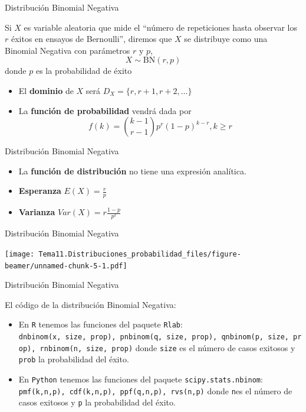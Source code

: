 \documentclass[
  ignorenonframetext,
]{beamer}
\providecommand{\tightlist}{%
  \setlength{\itemsep}{0pt}\setlength{\parskip}{0pt}}
\begin{document}
\begin{frame}{Distribución Binomial Negativa}
\protect\hypertarget{distribuciuxf3n-binomial-negativa}{}

Si \(X\) es variable aleatoria que mide el ``número de repeticiones
hasta observar los \(r\) éxitos en ensayos de Bernoulli'', diremos que
\(X\) se distribuye como una Binomial Negativa con parámetros \(r\) y
\(p\), \[X\sim\text{BN}(r,p)\] donde \(p\) es la probabilidad de éxito

\begin{itemize}
\tightlist
\item
  El \textbf{dominio} de \(X\) será \(D_X = \{r, r+1, r+2,\dots\}\)
\item
  La \textbf{función de probabilidad} vendrá dada por
  \[f(k) = {k-1\choose r-1}p^r(1-p)^{k-r}, k\geq r\]
\end{itemize}

\end{frame}

\begin{frame}{Distribución Binomial Negativa}
\protect\hypertarget{distribuciuxf3n-binomial-negativa-1}{}

\begin{itemize}
\tightlist
\item
  La \textbf{función de distribución} no tiene una expresión analítica.
\item
  \textbf{Esperanza} \(E(X) = \frac{r}{p}\)
\item
  \textbf{Varianza} \(Var(X) = r\frac{1-p}{p^2}\)
\end{itemize}

\end{frame}

\begin{frame}{Distribución Binomial Negativa}
\protect\hypertarget{distribuciuxf3n-binomial-negativa-2}{}

\texttt{[image: Tema11.Distribuciones\_probabilidad\_files/figure-beamer/unnamed-chunk-5-1.pdf]}

\end{frame}

\begin{frame}[fragile]{Distribución Binomial Negativa}
\protect\hypertarget{distribuciuxf3n-binomial-negativa-3}{}

El código de la distribución Binomial Negativa:

\begin{itemize}
\tightlist
\item
  En \texttt{R} tenemos las funciones del paquete \texttt{Rlab}:
  \texttt{dnbinom(x,\ size,\ prop),\ pnbinom(q,\ size,\ prop),\ qnbinom(p,\ size,\ prop),\ rnbinom(n,\ size,\ prop)}
  donde \texttt{size} es el número de casos exitosos y \texttt{prob} la
  probabilidad del éxito.
\item
  En \texttt{Python} tenemos las funciones del paquete
  \texttt{scipy.stats.nbinom}:
  \texttt{pmf(k,n,p),\ cdf(k,n,p),\ ppf(q,n,p),\ rvs(n,p)} donde
  \texttt{n}es el número de casos exitosos y \texttt{p} la probabilidad
  del éxito.
\end{itemize}

\end{frame}
\end{document}
